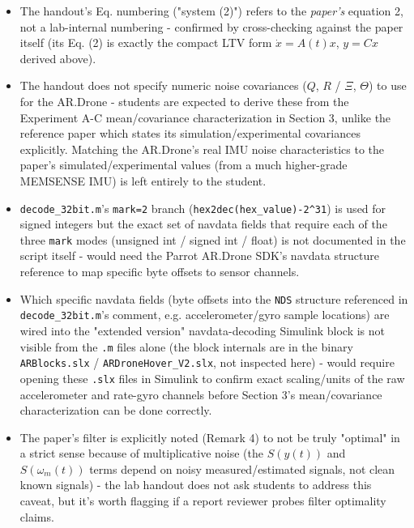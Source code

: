 \documentclass[11pt]{article}
\begin{document}
\begin{itemize}
\item The handout's Eq. numbering ("system (2)") refers to the \textit{paper's} equation 2, not a lab-internal numbering - confirmed by cross-checking against the paper itself (its Eq. (2) is exactly the compact LTV form $\dot x=A(t)x$, $y=Cx$ derived above).
\item The handout does not specify numeric noise covariances ($Q$, $R$ / $\Xi$, $\Theta$) to use for the AR.Drone - students are expected to derive these from the Experiment A-C mean/covariance characterization in Section 3, unlike the reference paper which states its simulation/experimental covariances explicitly. Matching the AR.Drone's real IMU noise characteristics to the paper's simulated/experimental values (from a much higher-grade MEMSENSE IMU) is left entirely to the student.
\item \texttt{decode\_\allowbreak{}32bit.m}'s \texttt{mark=2} branch (\texttt{hex2dec(hex\_\allowbreak{}value)-2\textasciicircum31}) is used for signed integers but the exact set of navdata fields that require each of the three \texttt{mark} modes (unsigned int / signed int / float) is not documented in the script itself - would need the Parrot AR.Drone SDK's navdata structure reference to map specific byte offsets to sensor channels.
\item Which specific navdata fields (byte offsets into the \texttt{NDS} structure referenced in \texttt{decode\_\allowbreak{}32bit.m}'s comment, e.g. accelerometer/gyro sample locations) are wired into the "extended version" navdata-decoding Simulink block is not visible from the \texttt{.m} files alone (the block internals are in the binary \texttt{ARBlocks.slx} / \texttt{ARDroneHover\_\allowbreak{}V2.slx}, not inspected here) - would require opening these \texttt{.slx} files in Simulink to confirm exact scaling/units of the raw accelerometer and rate-gyro channels before Section 3's mean/covariance characterization can be done correctly.
\item The paper's filter is explicitly noted (Remark 4) to not be truly "optimal" in a strict sense because of multiplicative noise (the $S(y(t))$ and $S(\omega_m(t))$ terms depend on noisy measured/estimated signals, not clean known signals) - the lab handout does not ask students to address this caveat, but it's worth flagging if a report reviewer probes filter optimality claims.
\end{itemize}
\end{document}
